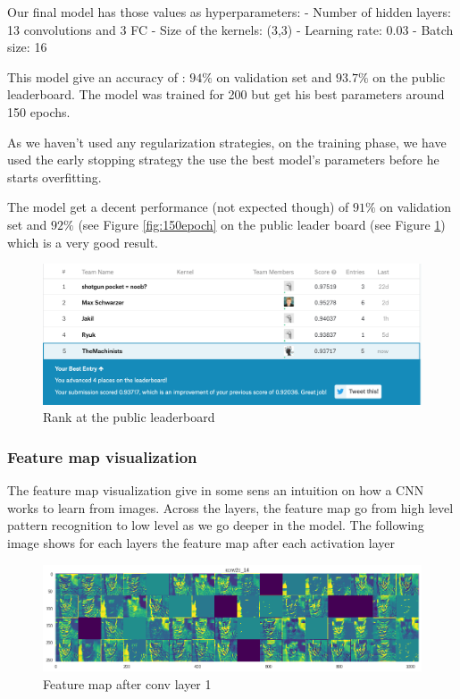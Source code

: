 \documentclass[a4paper]{article}
\begin{document}
Our final model has those values as hyperparameters:
- Number of hidden layers: 13 convolutions and 3 FC
- Size of the kernels: (3,3)
- Learning rate: 0.03
- Batch size: 16

This model give an accuracy of : $94\%$ on validation set and $93.7\%$ on the public leaderboard. The model was trained for 200 but get his best parameters around 150 epochs.

As we haven't used any regularization strategies, on the training phase, we have used the early stopping strategy the use the best model's parameters before he starts overfitting.

The model get a decent performance (not expected though) of $91\%$ on validation set and $92\%$ (see Figure \ref{fig:150epoch} on the public leader board (see Figure \ref{fig:kaggle}) which is a very good result.

\begin{figure}[h!]
	\centering
	\includegraphics[scale=.4]{kaggle.png}
	\caption{Rank at the public leaderboard}
	\label{fig:kaggle}
\end{figure}

\subsubsection{Feature map visualization}
The feature map visualization give in some sens an intuition on how a CNN works to learn from images. Across the layers, the feature map go from high level pattern recognition to low level as we go deeper in the model. The following image shows for each layers the feature map after each activation layer

\begin{figure}[h!]
	\centering
	\includegraphics[scale=.3]{fp1.png}
	\caption{Feature map after conv layer 1}
	\label{fig:fp1}
\end{figure}
\end{document}
